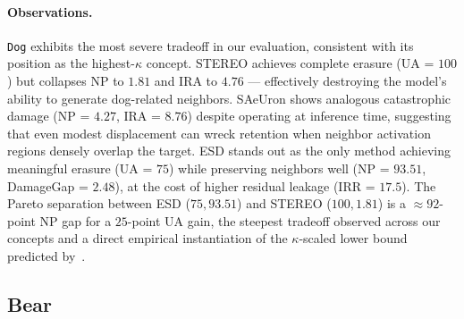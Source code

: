 \paragraph{Observations.}
\texttt{Dog} exhibits the most severe tradeoff in our evaluation, consistent with its position as the highest-$\hat\kappa$ concept. STEREO achieves complete erasure (UA = $100$) but collapses NP to $1.81$ and IRA to $4.76$ --- effectively destroying the model's ability to generate dog-related neighbors. SAeUron shows analogous catastrophic damage (NP = $4.27$, IRA = $8.76$) despite operating at inference time, suggesting that even modest displacement can wreck retention when neighbor activation regions densely overlap the target. ESD stands out as the only method achieving meaningful erasure (UA = $75$) while preserving neighbors well (NP = $93.51$, DamageGap = $2.48$), at the cost of higher residual leakage (IRR = $17.5$). The Pareto separation between ESD ($75, 93.51$) and STEREO ($100, 1.81$) is a $\approx 92$-point NP gap for a $25$-point UA gain, the steepest tradeoff observed across our concepts and a direct empirical instantiation of the $\kappa$-scaled lower bound predicted by~.


\subsection{Bear}
\label{app:per_concept_bear}

